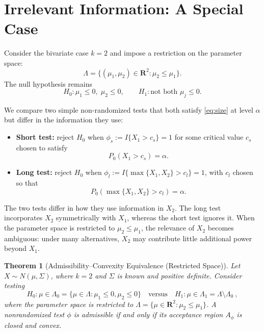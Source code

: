 \documentclass[12pt]{article}
\newtheorem{theorem}{Theorem}
\theoremstyle{definition}
\theoremstyle{remark}
\begin{document}

\newpage 
\section*{Irrelevant Information: A Special Case}

Consider the bivariate case $k = 2$ and impose a restriction on the parameter space:
\[
\Lambda = \{ (\mu_1, \mu_2) \in \mathbf{R}^2 : \mu_2 \le \mu_1 \}.
\]
The null hypothesis remains
\[
H_0 : \mu_1 \le 0, \; \mu_2 \le 0, \qquad H_1 : \text{not both } \mu_j \le 0.
\]

We compare two simple non-randomized tests that both satisfy \eqref{eq:size} at level $\alpha$ but differ in the information they use:

\begin{itemize}
    \item \textbf{Short test:} reject $H_0$ when $\phi_{s} := I\{X_1 > c_s\}=1$ for some critical value $c_s$ chosen to satisfy
    \[
    P_{0}(X_1 > c_s) = \alpha.
    \]

    \item \textbf{Long test:} reject $H_0$ when $\phi_{l} :=I\{\max\{X_1, X_2\} > c_l\}=1$, with $c_l$ chosen so that
    \[
    P_{0}(\max\{X_1, X_2\} > c_l) = \alpha.
    \]
\end{itemize}

The two tests differ in how they use information in $X_2$.  The long test incorporates $X_2$ symmetrically with $X_1$, whereas the short test ignores it.  When the parameter space is restricted to $\mu_2 \le \mu_1$, the relevance of $X_2$ becomes ambiguous: under many alternatives, $X_2$ may contribute little additional power beyond $X_1$.  

\begin{theorem}[Admissibility–Convexity Equivalence (Restricted Space)]
\label{thm:restricted-admissibility-convexity}
Let $X \sim N(\mu,\Sigma)$, where $k=2$ and $\Sigma$ is known and positive definite.
Consider testing 
$$ H_0 : \mu \in \Lambda_0 = \{\mu \in \Lambda : \mu_1 \le 0, \mu_2 \le 0\} \quad \text{versus}\quad  H_1 : \mu \in \Lambda_1 = \Lambda \setminus \Lambda_0~,$$ 
where the parameter space is restricted to $\Lambda = \{\mu \in \mathbf{R}^2 : \mu_2 \le \mu_1\}$.
A nonrandomized test $\phi$ is admissible if and only if its acceptance region $A_\phi$ is closed and convex.
\end{theorem}
\end{document}
